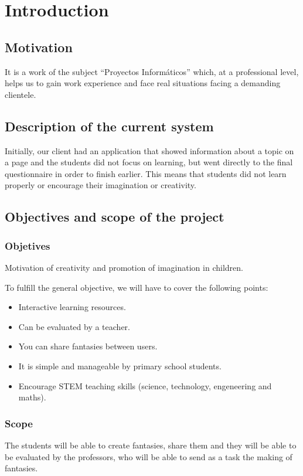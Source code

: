 \chapter{Introduction}
\section{Motivation}
It is a work of the subject ``Proyectos Informáticos'' which, at a professional level, helps us to gain work experience and face real situations facing a demanding clientele.

\section{Description of the current system}
Initially, our client had an application that showed information about a topic on a page and the students did not focus on learning, but went directly to the final questionnaire in order to finish earlier. This means that students did not learn properly or encourage their imagination or creativity.

\section{Objectives and scope of the project}
\subsection{Objetives}
Motivation of creativity and promotion of imagination in children.

To fulfill the general objective, we will have to cover the following points:
\begin{itemize}
	\item Interactive learning resources.
	\item Can be evaluated by a teacher.
	\item You can share fantasies between users.
	\item It is simple and manageable by primary school students.
	\item Encourage STEM teaching skills (science, technology, engeneering and maths).
\end{itemize}

\subsection{Scope}
The students will be able to create fantasies, share them and they will be able to be evaluated by the professors, who will be able to send as a task the making of fantasies.

